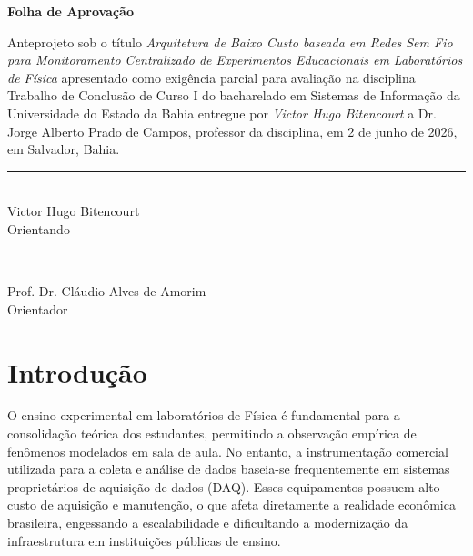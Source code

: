 \documentclass[12pt,a4paper]{article}
\begin{document}
\begin{titlepage}
    \begin{center}
        {\Large \textbf{Folha de Aprovação}} \\[2cm]
    \end{center}
    
    Anteprojeto sob o título \textit{Arquitetura de Baixo Custo baseada em Redes Sem Fio para Monitoramento Centralizado de Experimentos Educacionais em Laboratórios de Física} apresentado como exigência parcial para avaliação na disciplina Trabalho de Conclusão de Curso I do bacharelado em Sistemas de Informação da Universidade do Estado da Bahia entregue por \textit{Victor Hugo Bitencourt} a Dr. Jorge Alberto Prado de Campos, professor da disciplina, em 2 de junho de 2026, em Salvador, Bahia.
    
    \vspace{3cm}
    
    \begin{center}
        \rule{10cm}{0.1mm} \\
        Victor Hugo Bitencourt \\
        Orientando \\[2cm]
        
        \rule{10cm}{0.1mm} \\
        Prof. Dr. Cláudio Alves de Amorim \\
        Orientador
    \end{center}
\end{titlepage}

\newpage
\tableofcontents
\thispagestyle{empty}
\newpage

\setcounter{page}{4} %

\section{Introdução}

O ensino experimental em laboratórios de Física é fundamental para a consolidação teórica dos estudantes, permitindo a observação empírica de fenômenos modelados em sala de aula. No entanto, a instrumentação comercial utilizada para a coleta e análise de dados baseia-se frequentemente em sistemas proprietários de aquisição de dados (DAQ). Esses equipamentos possuem alto custo de aquisição e manutenção, o que afeta diretamente a realidade econômica brasileira, engessando a escalabilidade e dificultando a modernização da infraestrutura em instituições públicas de ensino.
\end{document}
